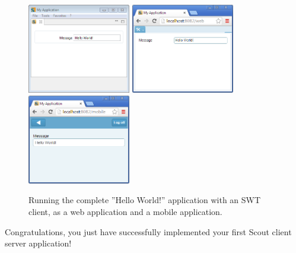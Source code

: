 \documentclass{article}
\begin{document}
\begin{figure}
\includegraphics[width=4.5cm]{helloworld_swt.png} \hspace{3mm}
\includegraphics[width=4.5cm]{helloworld_web.png} \hspace{3mm}
\includegraphics[width=4.5cm]{helloworld_mobile.png}
\caption{Running the complete ''Hello World!'' application with an SWT client, as a web application and a mobile application.}
\end{figure}

Congratulations, you just have successfully implemented your first Scout client server application!
\end{document}
